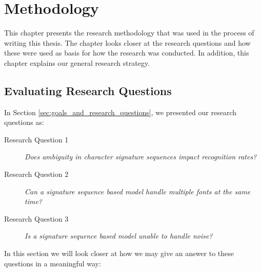 
\chapter{Methodology}
\label{ch:methodology}
This chapter presents the research methodology that was used in the process of writing this thesis. The chapter looks closer at the research questions and how these were used as basis for how the research was conducted. In addition, this chapter explains our general research strategy.


\section{Evaluating Research Questions}
\label{sec:research_questions_and_approach}
In Section \ref{sec:goals_and_research_questions}, we presented our research questions as:

\begin{description}
    \item[Research Question 1]{\textit{Does ambiguity in character signature sequences impact recognition rates?}}
    \item[Research Question 2]{\textit{Can a signature sequence based model handle multiple fonts at the same time?}}
    \item[Research Question 3]{\textit{Is a signature sequence based model unable to handle noise?}}
\end{description}

\newpage
In this section we will look closer at how we may give an answer to these questions in a meaningful way:

